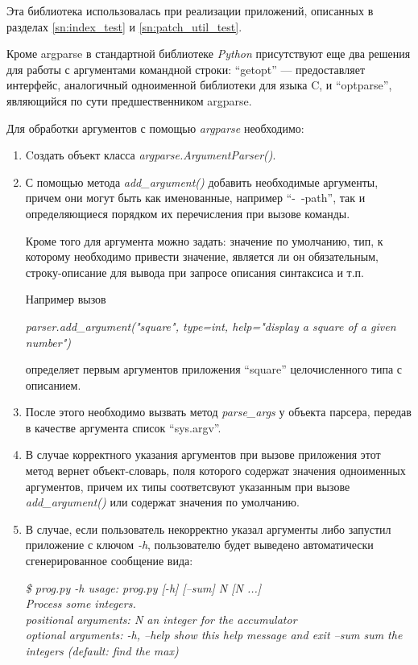 Эта библиотека использовалась при реализации приложений, описанных 
в разделах \ref{sn:index_test} и \ref{sn:patch_util_test}.

Кроме argparse в стандартной библиотеке \textit{Python} присутствуют еще два
решения для работы с аргументами командной строки: 
``getopt'' --- предоставляет интерфейс, аналогичный одноименной библиотеки для языка C,
и ``optparse'', являющийся по сути предшественником argparse.

Для обработки аргументов с помощью \textit{argparse} необходимо:
\begin{enumerate}
\item
Cоздать объект класса \textit{argparse.ArgumentParser()}.
\item
С помощью метода \textit{add\_argument()} добавить необходимые аргументы, причем они могут быть как
именованные, например ``-\ -path'', так и определяющиеся порядком их перечисления при вызове команды.

Кроме того для аргумента можно задать: значение по умолчанию, тип, к которому необходимо привести значение,
является ли он обязательным, строку-описание для вывода при запросе описания синтаксиса и т.п.

Например вызов

\textit{parser.add\_argument("square", type=int, help="display a square of a given number")}

определяет первым аргументов приложения ``square'' целочисленного типа с описанием.
\item
После этого необходимо вызвать метод \textit{parse\_args} у объекта парсера,
передав в качестве аргумента список ``sys.argv''.
\item
В случае корректного указания аргументов при вызове приложения
этот метод вернет объект-словарь, поля которого содержат значения одноименных
аргументов, причем их типы соответсвуют указанным при вызове \textit{add\_argument()}
или содержат значения по умолчанию.
\item
В случае, если пользователь некорректно указал аргументы либо запустил приложение
с ключом \textit{-h}, пользователю будет выведено автоматически сгенерированное сообщение
вида:

\textit{\$ prog.py -h
usage: prog.py [-h] [--sum] N [N ...]\\
Process some integers.\\
positional arguments:
 N           an integer for the accumulator\\
optional arguments:
 -h, --help  show this help message and exit
 --sum       sum the integers (default: find the max)
}
\end{enumerate}

